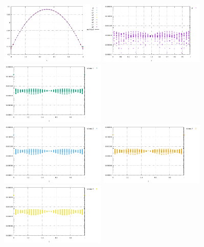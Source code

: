 \begin{center}
\includegraphics[width=5cm]{python_codes/fieldstone_12/results/reg/pressure}
\includegraphics[width=5cm]{python_codes/fieldstone_12/results/reg/p_error}
\includegraphics[width=5cm]{python_codes/fieldstone_12/results/reg/q1_error}\\
\includegraphics[width=5cm]{python_codes/fieldstone_12/results/reg/q2_error}
\includegraphics[width=5cm]{python_codes/fieldstone_12/results/reg/q3_error}
\includegraphics[width=5cm]{python_codes/fieldstone_12/results/reg/q4_error}\\

\end{center}
